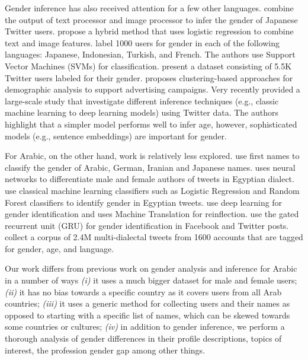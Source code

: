 \documentclass[sigconf,authorversion,nonacm]{acmart}
\begin{document}
Gender inference has also received attention for a few other languages. \citet{sakaki-etal-2014-twitter} combine the output of text processor and image processor to infer the gender of Japanese Twitter users. \citet{taniguchi-etal-2015-weighted} propose a hybrid method that uses logistic regression to combine text and image features. \citet{ciot-etal-2013-gender} label 1000 users for gender in each of the following languages:  Japanese, Indonesian, Turkish, and French. The authors use Support Vector Machines (SVMs) for classification. \citet{sezerer-etal-2019-turkish} present a dataset consisting of 5.5K Twitter users labeled for their gender. 
\citet{9023806} proposes clustering-based approaches for demographic analysis to support advertising campaigns. Very recently \citet{liu2021comparative} provided a large-scale study that investigate different inference techniques (e.g., classic machine learning to deep learning models) using Twitter data. The authors highlight that a simpler model performs well to infer age, however, sophisticated models (e.g., sentence embeddings) are important for gender. 

For Arabic, on the other hand, work is relatively less explored. \citet{malmasi-2014-data} use first names to classify the gender of Arabic, German, Iranian and Japanese names. \citet{ELSAYED2020159} uses neural networks to differentiate male and female authors of tweets in Egyptian dialect. \citet{HUSSEIN2019109} use classical machine learning classifiers such as Logistic Regression and Random Forest classifiers to identify gender in Egyptian tweets. \citet{habash-etal-2019-automatic} use deep learning for gender identification and uses Machine Translation for reinflection. \citet{Bsir2018Enhancing} use the gated recurrent unit (GRU) for gender identification in Facebook and Twitter posts. \citet{zaghouani2018arap} collect a corpus of 2.4M multi-dialectal tweets from 1600 accounts that are tagged for gender, age, and language.



Our work differs from previous work on gender analysis and inference for Arabic in a number of ways {\em(i)} it uses a much bigger dataset for male and female users; {\em(ii)} it has no bias towards a specific country as it covers users from all Arab countries; {\em(iii)} it uses a generic method for collecting users and their names as opposed to starting with a specific list of names, which can be skewed towards some countries or cultures; {\em(iv)} in addition to gender inference, we perform a thorough analysis of gender differences in their profile descriptions, topics of interest, the profession gender gap among other things.
\end{document}
